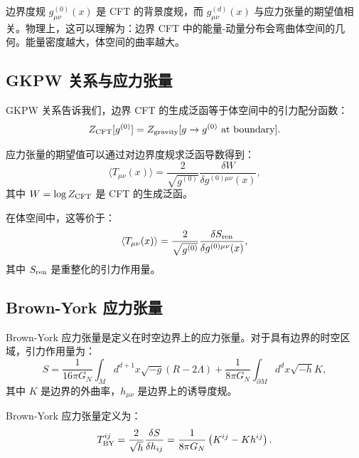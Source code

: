 \begin{note}[边界展开的物理意义]
边界度规 $g_{\mu\nu}^{(0)}(x)$ 是 CFT 的背景度规，而 $g_{\mu\nu}^{(d)}(x)$ 与应力张量的期望值相关。物理上，这可以理解为：边界 CFT 中的能量-动量分布会弯曲体空间的几何。能量密度越大，体空间的曲率越大。
\end{note}

\subsection{GKPW 关系与应力张量}

GKPW 关系告诉我们，边界 CFT 的生成泛函等于体空间中的引力配分函数：
\begin{equation}
    Z_{\rm CFT}[g^{(0)}] = Z_{\rm gravity}[g \to g^{(0)} \text{ at boundary}].
\end{equation}

应力张量的期望值可以通过对边界度规求泛函导数得到：
\begin{equation}
    \langle T_{\mu\nu}(x) \rangle = \frac{2}{\sqrt{g^{(0)}}} \frac{\delta W}{\delta g^{(0)\mu\nu}(x)},
\end{equation}
其中 $W = \log Z_{\rm CFT}$ 是 CFT 的生成泛函。

在体空间中，这等价于：
\begin{equation}
    \langle T_{\mu\nu}(x) \rangle = \frac{2}{\sqrt{g^{(0)}}} \frac{\delta S_{\rm ren}}{\delta g^{(0)\mu\nu}(x)},
\end{equation}
其中 $S_{\rm ren}$ 是重整化的引力作用量。

\subsection{Brown-York 应力张量}

Brown-York 应力张量是定义在时空边界上的应力张量\cite{Brown1993}。对于具有边界的时空区域，引力作用量为：
\begin{equation}
    S = \frac{1}{16\pi G_N} \int_M d^{d+1}x \sqrt{-g} (R - 2\Lambda) + \frac{1}{8\pi G_N} \int_{\partial M} d^d x \sqrt{-h} K,
\end{equation}
其中 $K$ 是边界的外曲率，$h_{\mu\nu}$ 是边界上的诱导度规。

\begin{definition}
Brown-York 应力张量定义为：
\begin{equation}
    T^{ij}_{\rm BY} = \frac{2}{\sqrt{h}} \frac{\delta S}{\delta h_{ij}} = \frac{1}{8\pi G_N} \left(K^{ij} - K h^{ij}\right).
\end{equation}
\end{definition}

